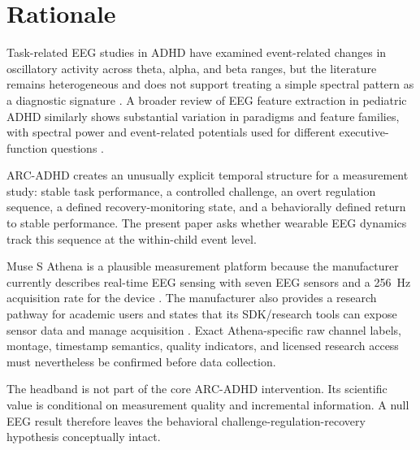 \section{Rationale}

Task-related EEG studies in ADHD have examined event-related changes in oscillatory activity across theta, alpha, and beta ranges, but the literature remains heterogeneous and does not support treating a simple spectral pattern as a diagnostic signature \parencite{michelini2022eventoscillations,slater2022eegsubtypes}. A broader review of EEG feature extraction in pediatric ADHD similarly shows substantial variation in paradigms and feature families, with spectral power and event-related potentials used for different executive-function questions \parencite{arpaia2022eegfeatures}.

ARC-ADHD creates an unusually explicit temporal structure for a measurement study: stable task performance, a controlled challenge, an overt regulation sequence, a defined recovery-monitoring state, and a behaviorally defined return to stable performance. The present paper asks whether wearable EEG dynamics track this sequence at the within-child event level.

Muse S Athena is a plausible measurement platform because the manufacturer currently describes real-time EEG sensing with seven EEG sensors and a 256~Hz acquisition rate for the device \parencite{interaxonAthena2026}. The manufacturer also provides a research pathway for academic users and states that its SDK/research tools can expose sensor data and manage acquisition \parencite{interaxonDevelopers2026}. Exact Athena-specific raw channel labels, montage, timestamp semantics, quality indicators, and licensed research access must nevertheless be confirmed before data collection.

The headband is not part of the core ARC-ADHD intervention. Its scientific value is conditional on measurement quality and incremental information. A null EEG result therefore leaves the behavioral challenge-regulation-recovery hypothesis conceptually intact.

